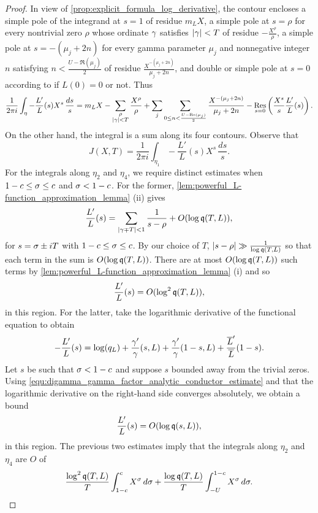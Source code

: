 \begin{proof}
      In view of \cref{prop:explicit_formula_log_derivative}, the contour encloses a simple pole of the integrand at \(s = 1\) of residue \(m_{L}X\), a simple pole at \(s = \rho\) for every nontrivial zero \(\rho\) whose ordinate \(\gamma\) satisfies \(|\gamma| < T\) of residue \(-\frac{X^{\rho}}{\rho}\), a simple pole at \(s = -(\mu_{j}+2n)\) for every gamma parameter \(\mu_{j}\) and nonnegative integer \(n\) satisfying \(n < \frac{U-\Re(\mu_{j})}{2}\) of residue \(\frac{X^{-(\mu_{j}+2n)}}{\mu_{j}+2n}\), and double or simple pole at \(s = 0\) according to if \(L(0) = 0\) or not. Thus
      \[
        \frac{1}{2\pi i}\int_{\eta}-\frac{L'}{L}(s)X^{s}\,\frac{ds}{s} = m_{L}X-\sum_{\substack{\rho \\ |\gamma| < T}}\frac{X^{\rho}}{\rho}+\sum_{j}\sum_{0 \le n < \frac{U-\mathrm{Re}(\mu_{j})}{2}}\frac{X^{-(\mu_{j}+2n)}}{\mu_{j}+2n}-\operatorname*{\mathrm{Res}}_{s = 0}\left(\frac{X^{s}}{s}\frac{L'}{L}(s)\right).
      \]
      On the other hand, the integral is a sum along its four contours. Observe that
      \[
        J(X,T) = \frac{1}{2\pi i}\int_{\eta_{1}}-\frac{L'}{L}(s)X^{s}\,\frac{ds}{s}.
      \]
      For the integrals along \(\eta_{2}\) and \(\eta_{4}\), we require distinct estimates when \(1-c \le \sigma \le c\) and \(\sigma < 1-c\). For the former, \cref{lem:powerful_L-function_approximation_lemma} (ii) gives
      \[
        \frac{L'}{L}(s) = \sum_{|\gamma\mp T| < 1}\frac{1}{s-\rho}+O(\log\mathfrak{q}(T,L)),
      \]
      for \(s = \sigma\pm iT\) with \(1-c \le \sigma \le c\). By our choice of \(T\), \(|s-\rho| \gg \frac{1}{\log\mathfrak{q}(T,L)}\) so that each term in the sum is \(O(\log\mathfrak{q}(T,L))\). There are at most \(O(\log\mathfrak{q}(T,L))\) such terms by \cref{lem:powerful_L-function_approximation_lemma} (i) and so
      \[
        \frac{L'}{L}(s) = O(\log^{2}\mathfrak{q}(T,L)),
      \]
      in this region. For the latter, take the logarithmic derivative of the functional equation to obtain
      \[
        -\frac{L'}{L}(s) = \log(q_{L})+\frac{\gamma'}{\gamma}(s,L)+\frac{\gamma'}{\gamma}(1-s,L)+\frac{\overline{L}'}{\overline{L}}(1-s).
      \]
      Let \(s\) be such that \(\sigma < 1-c\) and suppose \(s\) bounded away from the trivial zeros. Using \cref{equ:digamma_gamma_factor_analytic_conductor_estimate} and that the logarithmic derivative on the right-hand side converges absolutely, we obtain a bound
      \[
        \frac{L'}{L}(s) = O(\log\mathfrak{q}(s,L)),
      \]
      in this region. The previous two estimates imply that the integrals along \(\eta_{2}\) and \(\eta_{4}\) are \(O\) of
      \[
        \frac{\log^{2}\mathfrak{q}(T,L)}{T}\int_{1-c}^{c}X^{\sigma}\,d\sigma+\frac{\log\mathfrak{q}(T,L)}{T}\int_{-U}^{1-c}X^{\sigma}\,d\sigma.
      \]

\end{proof}
